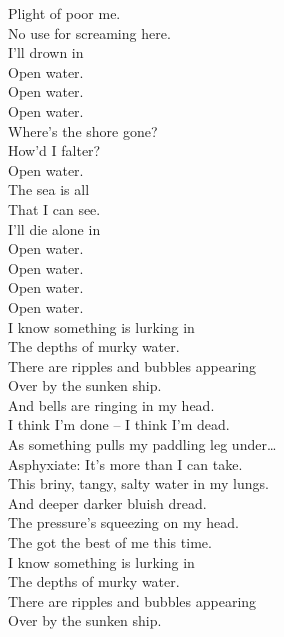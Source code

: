 Plight of poor me. \\
No use for screaming here. \\
I'll drown in \\
Open water. \\

Open water. \\

Open water. \\
Where's the shore gone? \\
How'd I falter? \\
Open water. \\

The sea is all \\
That I can see. \\
I'll die alone in \\
Open water. \\

Open water. \\
Open water. \\
Open water. \\

I know something is lurking in \\
The depths of murky water. \\
There are ripples and bubbles appearing \\
Over by the sunken ship. \\

And bells are ringing in my head. \\
I think I'm done -- I think I'm dead. \\
As something pulls my paddling leg under… \\

Asphyxiate: It's more than I can take. \\
This briny, tangy, salty water in my lungs. \\

And deeper darker bluish dread. \\
The pressure's squeezing on my head. \\
The  got the best of me this time. \\

I know something is lurking in \\
The depths of murky water. \\
There are ripples and bubbles appearing \\
Over by the sunken ship. \\

